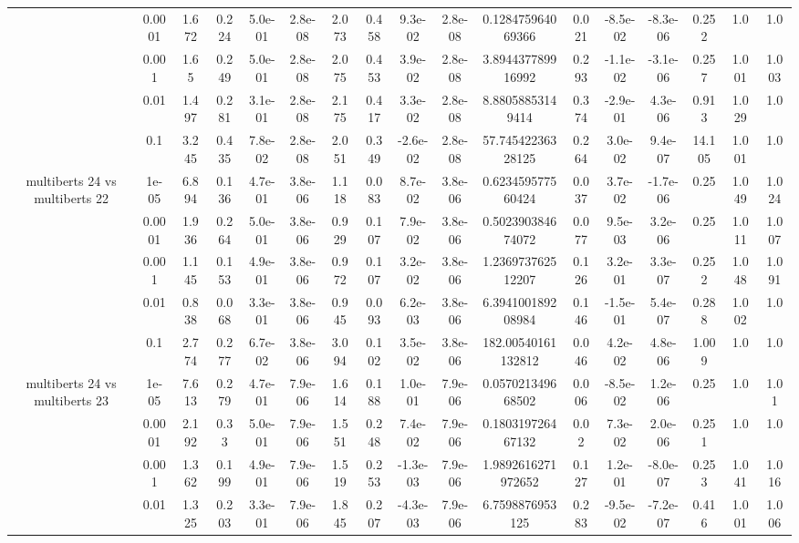 \begin{tabular}{|c|c|c|c|c|c|c|c|c|c|c|c|c|c|c|c|c|}
 & 0.0001 & 1.672 & 0.224 & 5.0e-01 & 2.8e-08 & 2.073 & 0.458 & 9.3e-02 & 2.8e-08 & 0.128475964069366 & 0.021 & -8.5e-02 & -8.3e-06 & 0.252 & 1.0 & 1.0 \\
 & 0.001 & 1.65 & 0.249 & 5.0e-01 & 2.8e-08 & 2.075 & 0.453 & 3.9e-02 & 2.8e-08 & 3.894437789916992 & 0.293 & -1.1e-02 & -3.1e-06 & 0.257 & 1.001 & 1.003 \\
 & 0.01 & 1.497 & 0.281 & 3.1e-01 & 2.8e-08 & 2.175 & 0.417 & 3.3e-02 & 2.8e-08 & 8.88058853149414 & 0.374 & -2.9e-01 & 4.3e-06 & 0.913 & 1.029 & 1.0 \\
 & 0.1 & 3.245 & 0.435 & 7.8e-02 & 2.8e-08 & 2.051 & 0.349 & -2.6e-02 & 2.8e-08 & 57.74542236328125 & 0.264 & 3.0e-02 & 9.4e-07 & 14.105 & 1.001 & 1.0 \\
\hline
\multirow{5}{*}{multiberts 24 vs multiberts 22} & 1e-05 & 6.894 & 0.136 & 4.7e-01 & 3.8e-06 & 1.118 & 0.083 & 8.7e-02 & 3.8e-06 & 0.623459577560424 & 0.037 & 3.7e-02 & -1.7e-06 & 0.25 & 1.049 & 1.024 \\
 & 0.0001 & 1.936 & 0.264 & 5.0e-01 & 3.8e-06 & 0.929 & 0.107 & 7.9e-02 & 3.8e-06 & 0.502390384674072 & 0.077 & 9.5e-03 & 3.2e-06 & 0.25 & 1.011 & 1.007 \\
 & 0.001 & 1.145 & 0.153 & 4.9e-01 & 3.8e-06 & 0.972 & 0.107 & 3.2e-02 & 3.8e-06 & 1.236973762512207 & 0.126 & 3.2e-01 & 3.3e-07 & 0.252 & 1.048 & 1.091 \\
 & 0.01 & 0.838 & 0.068 & 3.3e-01 & 3.8e-06 & 0.945 & 0.093 & 6.2e-03 & 3.8e-06 & 6.394100189208984 & 0.146 & -1.5e-01 & 5.4e-07 & 0.288 & 1.002 & 1.0 \\
 & 0.1 & 2.774 & 0.277 & 6.7e-02 & 3.8e-06 & 3.094 & 0.102 & 3.5e-02 & 3.8e-06 & 182.00540161132812 & 0.046 & 4.2e-02 & 4.8e-06 & 1.009 & 1.0 & 1.0 \\
\hline
\multirow{5}{*}{multiberts 24 vs multiberts 23} & 1e-05 & 7.613 & 0.279 & 4.7e-01 & 7.9e-06 & 1.614 & 0.188 & 1.0e-01 & 7.9e-06 & 0.057021349668502 & 0.006 & -8.5e-02 & 1.2e-06 & 0.25 & 1.0 & 1.01 \\
 & 0.0001 & 2.192 & 0.33 & 5.0e-01 & 7.9e-06 & 1.551 & 0.248 & 7.4e-02 & 7.9e-06 & 0.180319726467132 & 0.02 & 7.3e-02 & 2.0e-06 & 0.251 & 1.0 & 1.0 \\
 & 0.001 & 1.362 & 0.199 & 4.9e-01 & 7.9e-06 & 1.519 & 0.253 & -1.3e-03 & 7.9e-06 & 1.9892616271972652 & 0.127 & 1.2e-01 & -8.0e-07 & 0.253 & 1.041 & 1.016 \\
 & 0.01 & 1.325 & 0.203 & 3.3e-01 & 7.9e-06 & 1.845 & 0.207 & -4.3e-03 & 7.9e-06 & 6.7598876953125 & 0.283 & -9.5e-02 & -7.2e-07 & 0.416 & 1.001 & 1.006 \\

\end{tabular}
